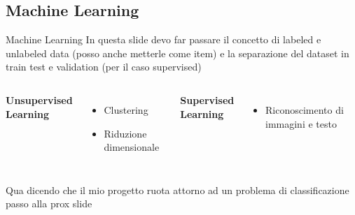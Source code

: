 \documentclass{beamer}
\begin{document}
\subsection{Machine Learning}
\begin{frame}{Machine Learning}
  In questa slide devo far passare il concetto di labeled e unlabeled data (posso anche metterle come item) e la separazione del dataset in train test e validation (per il caso supervised)
  \begin{columns}[T]
      \vspace*{3ex}
      \begin{block}{}
        \centering
        \textbf{
        Unsupervised\\[.5ex]
        Learning}
      \end{block}
      \vspace*{1ex}
      \vspace*{1ex}
      \begin{itemize}
        \item Clustering
        \item Riduzione dimensionale
      \end{itemize}
%
      \vspace*{3ex}
      \begin{block}{}
        \centering
        \textbf{
        Supervised\\[.5ex]
        Learning}
      \end{block}
      \vspace*{1ex}
      \vspace*{1ex}
      \begin{itemize}
        \item Riconoscimento di immagini e testo
      \end{itemize}
  \end{columns}
  \vspace{3ex}
  Qua dicendo che il mio progetto ruota attorno ad un problema di classificazione passo alla prox slide
\end{frame}
\end{document}
